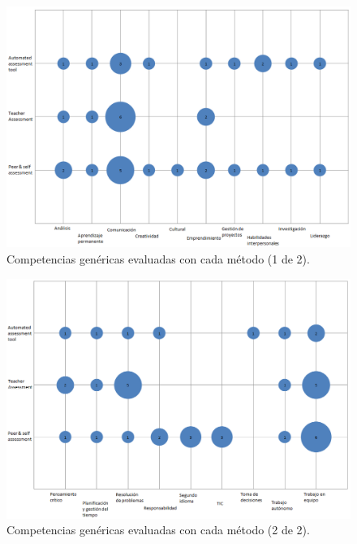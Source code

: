 \pagestyle{empty}
\begin{landscape}
\begin{figure}[h]
  \begin{center}
    \includegraphics[scale=0.6]{BurbujaCompetencias1.png}
  \end{center}
  \caption{Competencias genéricas evaluadas con cada método (1 de 2).}
  \label{fig:competencias1}
\end{figure}

\begin{figure}[h]
  \begin{center}
    \includegraphics[scale=0.6]{BurbujaCompetencias2.png}
  \end{center}
  \caption{Competencias genéricas evaluadas con cada método (2 de 2).}
  \label{fig:competencias2}
\end{figure}

\end{landscape}
\pagestyle{fancy}

